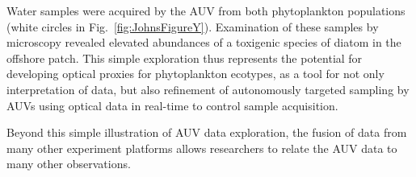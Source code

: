 Water samples were acquired by the AUV from both phytoplankton populations (white circles in Fig.~\ref{fig:JohnsFigureY}).  Examination of these samples by microscopy revealed elevated abundances of a toxigenic species of diatom in the offshore patch.  This simple exploration thus represents the potential for developing optical proxies for phytoplankton ecotypes, as a tool for not only interpretation of data, but also refinement of autonomously targeted sampling by AUVs using optical data in real-time to control sample acquisition.

Beyond this simple illustration of AUV data exploration, the fusion of data from many other experiment platforms allows researchers to relate the AUV data to many other observations.

